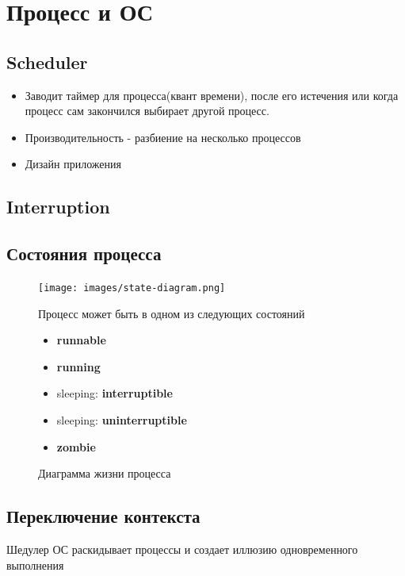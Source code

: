 \documentclass[../../lectures.tex]{subfiles}
\begin{document}
\section{Процесс и ОС}
\subsection{Scheduler}
\begin{itemize}
    \item Заводит таймер для процесса(квант времени), после его истечения 
    или когда процесс сам закончился выбирает другой процесс.

    \item Производительность - разбиение на несколько процессов

    \item Дизайн приложения
\end{itemize}
\subsection{Interruption}

\subsection{Состояния процесса}
\begin{figure}[H]
\begin{minipage}[c]{0.6\linewidth}
\centering
\texttt{[image: images/state-diagram.png]}
\caption{Диаграмма жизни процесса}
\end{minipage}
\begin{minipage}[c]{0.4\linewidth}
\centering
Процесс может быть в одном из следующих состояний
\begin{itemize}
    \item \textbf{runnable}
    \item \textbf{running}
    \item sleeping: \textbf{interruptible}
    \item sleeping: \textbf{uninterruptible}
    \item \textbf{zombie}
\end{itemize}
\end{minipage}
\end{figure}

\subsection{Переключение контекста}
Шедулер ОС раскидывает процессы и создает иллюзию одновременного выполнения
\end{document}
